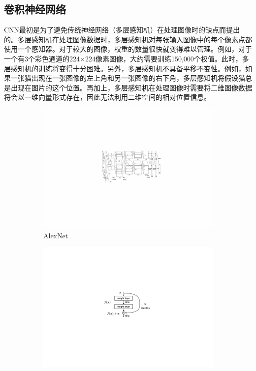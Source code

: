 \subsection{卷积神经网络}\label{subsec:cnn_introduction}
CNN最初是为了避免传统神经网络（多层感知机）在处理图像时的缺点而提出的。多层感知机在处理图像数据时，多层感知机对每张输入图像中的每个像素点都使用一个感知器。对于较大的图像，权重的数量很快就变得难以管理。例如，对于一个有3个彩色通道的224$\times$224像素图像，大约需要训练150,000个权值。此时，多层感知机的训练将变得十分困难。另外，多层感知机不具备平移不变性。例如，如果一张猫出现在一张图像的左上角和另一张图像的右下角，多层感知机将假设猫总是出现在图片的这个位置。再加上，多层感知机在处理图像时需要将二维图像数据将会以一维向量形式存在，因此无法利用二维空间的相对位置信息。

\begin{figure}[h!] %
	\centering
	\begin{subfigure}{0.35\textwidth}
		\centering
		\includegraphics[width=1.0\textwidth]{figure/popular_networks_alex_net}
		\caption{AlexNet~\cite{krizhevsky2012imagenet}}
		\label{subfig1}
	\end{subfigure}
	\quad
	\begin{subfigure}{0.336\textwidth}
		\centering
		\includegraphics[width=1.0\textwidth]{figure/popular_networks_resnet}

\end{subfigure}
\end{figure}

